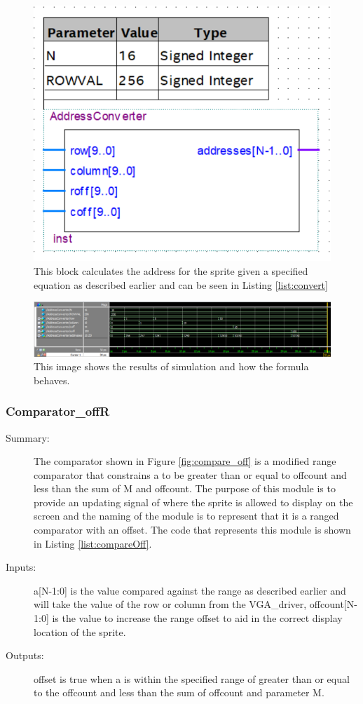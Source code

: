 \documentclass[a4paper]{article}
\begin{document}
\begin{figure}[H]
    \centering
    \includegraphics[width=.5\textwidth]{Images/AddressConverter.png}
    \caption{This block calculates the address for the sprite given a specified equation as described earlier and can be seen in Listing \ref{list:convert}}
    \label{fig:Address}
\end{figure}

\begin{figure}[H]
    \centering
    \includegraphics[width=5.91in]{Images/AddressConverterSim.png}
    \caption{This image shows the results of simulation and how the formula behaves.}
    \label{fig:Address_Sim}
\end{figure}

\subsubsection{Comparator\_offR}
\begin{description}
    \item[Summary: ] The comparator shown in Figure \ref{fig:compare_off} is a modified range comparator that constrains a to be greater than or equal to offcount and less than the sum of M and offcount. The purpose of this module is to provide an updating signal of where the sprite is allowed to display on the screen and the naming of the module is to represent that it is a ranged comparator with an offset. The code that represents this module is shown in Listing \ref{list:compareOff}.
    
    \item[Inputs: ] a[N-1:0] is the value compared against the range as described earlier and will take the value of the row or column from the VGA\_driver, offcount[N-1:0] is the value to increase the range offset to aid in the correct display location of the sprite.
    
    \item[Outputs: ] offset is true when a is within the specified range of greater than or equal to the offcount and less than the sum of offcount and parameter M.
\end{description}
\end{document}
